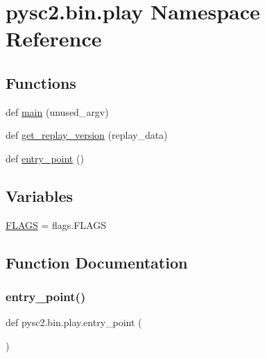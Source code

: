 \hypertarget{namespacepysc2_1_1bin_1_1play}{}\section{pysc2.\+bin.\+play Namespace Reference}
\label{namespacepysc2_1_1bin_1_1play}
\subsection*{Functions}
\begin{DoxyCompactItemize}
\item 
def \mbox{\hyperlink{namespacepysc2_1_1bin_1_1play_a79f12f105f52254b03258d902114533e}{main}} (unused\+\_\+argv)
\item 
def \mbox{\hyperlink{namespacepysc2_1_1bin_1_1play_afe5c686e77a19a5e4407a43a95ec4cc4}{get\+\_\+replay\+\_\+version}} (replay\+\_\+data)
\item 
def \mbox{\hyperlink{namespacepysc2_1_1bin_1_1play_a040fa25ba8942fd26fd7d38018aa1c3b}{entry\+\_\+point}} ()
\end{DoxyCompactItemize}
\subsection*{Variables}
\begin{DoxyCompactItemize}
\item 
\mbox{\hyperlink{namespacepysc2_1_1bin_1_1play_a811859d3668269662298994543f792d8}{F\+L\+A\+GS}} = flags.\+F\+L\+A\+GS
\end{DoxyCompactItemize}


\subsection{Function Documentation}
\mbox{\label{namespacepysc2_1_1bin_1_1play_a040fa25ba8942fd26fd7d38018aa1c3b}} 
\subsubsection{\texorpdfstring{entry\+\_\+point()}{entry\_point()}}
{\footnotesize\ttfamily def pysc2.\+bin.\+play.\+entry\+\_\+point (\begin{DoxyParamCaption}{ }\end{DoxyParamCaption})}

